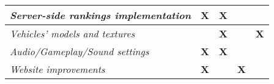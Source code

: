 \begin{landscape}
\begin{table}[]
\begin{tabular}{|lcccc|}
\multicolumn{1}{|l|}{\textit{Server-side rankings implementation}}                                                                                & \textbf{X}                                    & \textbf{X}                                  & \textbf{}                                       & \textbf{}                                    \\ \hline
\multicolumn{1}{|l|}{\textit{Vehicles' models and textures}}                                                                                      & \textbf{}                                     & \textbf{X}                                  & \textbf{}                                       & \textbf{X}                                   \\ \hline
\multicolumn{1}{|l|}{\textit{Audio/Gameplay/Sound settings}}                                                                                      & \textbf{X}                                    & \textbf{X}                                  & \textbf{}                                       & \textbf{}                                    \\ \hline
\multicolumn{1}{|l|}{\textit{Website improvements}}                                                                                               & \textbf{X}                                    & \textbf{}                                   & \textbf{X}                                      & \textbf{}                                    \\ \hline
\end{tabular}
\end{table}



\end{landscape}
